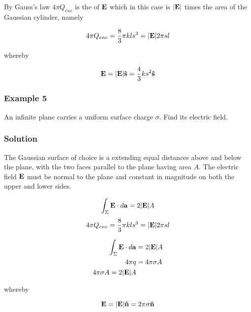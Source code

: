 By Gauss's law $4\pi Q_{enc}$ is the  of $\vb{E}$ which in this case is $\abs{\vb{E}}$ times the area of the Gaussian cylinder, namely

$$4 \pi Q_{enc} =  \frac{8}{3}\pi k l s^3 = \abs{\vb{E}} 2 \pi s l$$

whereby 

$$\vb{E} = \abs{\vb{E}} \vu{s} = \frac{4}{3}k s^2 \vu{s}$$


\subsubsection*{Example 5}
An infinite plane carries a uniform surface charge $\sigma$. Find its electric field.

\subsubsection*{Solution}
The Gaussian surface of choice is a  extending equal distances above and below the plane, with the two faces parallel to the plane having area $A$. The electric field $\vb{E}$ must be normal to the plane and constant in magnitude on both the upper and lower sides. 

$$\int_{\Sigma} \vb{E} \cdot d\vb{a} = 2 \abs{\vb{E}} A $$
$$4 \pi Q_{enc} =  \frac{8}{3}\pi k l s^3 = \abs{\vb{E}} 2 \pi s l$$

\begin{align*}
\int_{\Sigma} \vb{E} \cdot d\vb{a} &=  2 \abs{\vb{E}} A \\
4\pi q &=  4 \pi \sigma A \\
4 \pi \sigma A = 2 \abs{\vb{E}} A
\end{align*}

whereby 

$$\vb{E} = \abs{\vb{E}} \vu{n} = 2 \pi \sigma \vu{n}$$
